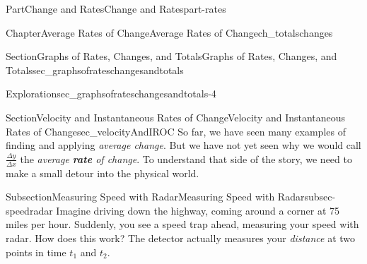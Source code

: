 \documentclass{tufte-book}
\newcommand{\terminology}[1]{\textbf{#1}}
\numberwithin{equation}{chapter}
\begin{document}
\begin{partptx}{Part}{Change and Rates}{}{Change and Rates}{}{}{part-rates}
\begin{chapterptx}{Chapter}{Average Rates of Change}{}{Average Rates of Change}{}{}{ch_totalschanges}
\begin{sectionptx}{Section}{Graphs of Rates, Changes, and Totals}{}{Graphs of Rates, Changes, and Totals}{}{}{sec_graphsofrateschangesandtotals}
\begin{exploration}{Exploration}{}{sec_graphsofrateschangesandtotals-4}
\begin{enumerate}[font=\bfseries,label=(\alph*),ref=\alph*]
\begin{image}{0.2}{0.6}{0.2}{}
{\begin{tikzpicture}[xscale=\xscale,yscale=\yscale]
\end{tikzpicture}
}%
\end{image}%
\end{enumerate}%
\end{exploration}%
\end{sectionptx}
%
%
\typeout{************************************************}
\typeout{************************************************}
%
\begin{sectionptx}{Section}{Velocity and Instantaneous Rates of Change}{}{Velocity and Instantaneous Rates of Change}{}{}{sec_velocityAndIROC}
So far, we have seen many examples of finding and applying \emph{average change}. But we have not yet seen why we would call \(\frac{\Delta y}{\Delta x}\) the \emph{average \terminology{rate} of change}. To understand that side of the story, we need to make a small detour into the physical world.%
%
%
\typeout{************************************************}
\typeout{************************************************}
%
\begin{subsectionptx}{Subsection}{Measuring Speed with Radar}{}{Measuring Speed with Radar}{}{}{subsec-speedradar}
Imagine driving down the highway, coming around a corner at 75 miles per hour. Suddenly, you see a speed trap ahead, measuring your speed with radar. How does this work? The detector actually measures your \emph{distance} at two points in time \(t_1\) and \(t_2\).%
\begin{image}{0}{1}{0}{}%
\end{image}
\end{subsectionptx}
\end{sectionptx}
\end{chapterptx}
\end{partptx}
\end{document}
